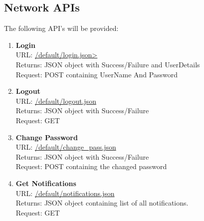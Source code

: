 \documentclass{article}
\begin{document}
			\subsection{Network APIs}
				The following API's will be provided:  ~\cite{Basic_Code}
				\begin{enumerate}
					\item \textbf{Login} \\
						URL: \url{/default/login.json>}  \\
						Returns: JSON object with Success/Failure and UserDetails	\\
						Request: POST containing UserName And Password
					\item \textbf{Logout} \\
						URL: \url{/default/logout.json} \\
						Returns: JSON object with Success/Failure\\
						Request: GET
					\item \textbf{Change Password} \\
						URL: \url{/default/change_pass.json} \\
						Returns: JSON object with Success/Failure \\
						Request: POST containing the changed password	
					\item \textbf{Get Notifications} \\
						URL: \url{/default/notifications.json} \\
						Returns: JSON object containing list of all notifications.\\
						Request: GET 
						

\end{enumerate}
\end{document}
